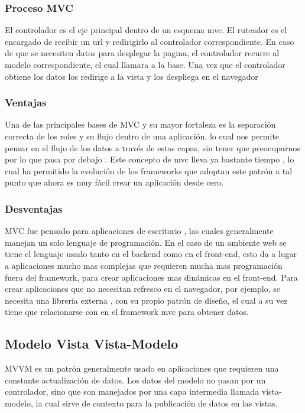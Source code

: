 \subsubsection{Proceso MVC}
El controlador es el eje principal dentro de un esquema mvc. El ruteador es el
encargado de recibir un url y redirigirlo al controlador correspondiente. En
caso de que se necesiten datos para desplegar la pagina, el controlador recurre
al modelo correspondiente, el cual llamara a la base. Una vez que el
controlador obtiene los datos los redirige a la vista y los despliega en el
navegador

\subsubsection{Ventajas}
Una de las principales bases de MVC y su mayor fortaleza es la separación
correcta de los roles y su flujo dentro de una aplicación, lo cual nos permite
pensar en el flujo de los datos a través de estas capas, sin tener que
preocuparnos por lo que pasa por debajo . Este concepto de mvc lleva ya
bastante tiempo , lo cual ha permitido la evolución de los frameworks que
adoptan este patrón a tal punto que ahora es muy fácil crear un aplicación
desde cero.

\subsubsection{Desventajas}
MVC fue pensado para aplicaciones de escritorio , las cuales generalmente
manejan un solo lenguaje de programación. En el caso de un ambiente web se
tiene el lenguaje usado tanto en el backend como en el front-end, esto da a
lugar a aplicaciones mucho mas complejas que requieren mucha mas programación
fuera del framework, para crear aplicaciones mas dinámicas en el front-end.
Para crear aplicaciones que no necesitan refresco en el navegador, por ejemplo,
se necesita una librería externa , con su propio patrón de diseño, el cual a su
vez tiene que relacionarse con en el framework mvc para obtener datos.

\subsection{Modelo Vista Vista-Modelo}
MVVM es un patrón generalmente usado en aplicaciones que requieren una
constante actualización de datos. Los datos del modelo no pasan por un
controlador, sino que son manejados por una capa intermedia llamada
vista-modelo, la cual sirve de contexto para la publicación de datos
en las vistas.

